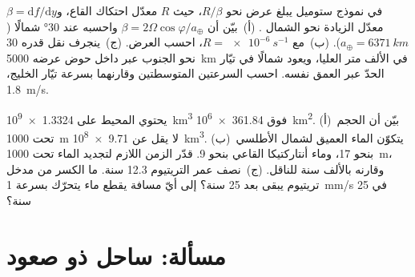 \begin{exercise}[$\star\star\star$]\label{exo:b1:ocean-circulation:11}
في نموذج ستوميل يبلغ عرض  نحو $R/\beta$، حيث $R$ معدّل احتكاك القاع، و$\beta = \mathrm df/\mathrm dy$ معدّل الزيادة نحو الشمال . (أ)~بيّن أن $\beta = 2\Omega
\cos\varphi/a_\oplus$ واحسبه عند \ang{30} شمالًا ($a_\oplus = \qty{6371}{km}$). (ب)~مع $R = \qty{e-6}{s^{-1}}$، احسب العرض. (ج)~ينجرف نقل قدره \qty{30}{\sverdrup} نحو الجنوب عبر داخل حوض عرضه \qty{5000}{km} في الألف متر العليا، ويعود شمالًا في تيّار الحدّ عبر العمق نفسه. احسب السرعتين المتوسطتين وقارنهما بسرعة تيّار الخليج، \qty{1.8}{m/s}.
\end{exercise}

\begin{exercise}[$\star\star\star$]\label{exo:b1:ocean-circulation:12}
يحتوي المحيط على \qty{1.3324e9}{km^3} فوق \qty{361.84e6}{km^2}. (أ)~بيّن أن الحجم تحت \qty{1000}{m} لا يقل عن \qty{9.71e8}{km^3}. (ب)~يتكوّن الماء العميق لشمال الأطلسي بنحو \qty{17}{\sverdrup}، وماء أنتاركتيكا القاعي بنحو \qty{9}{\sverdrup}. قدّر الزمن اللازم لتجديد الماء تحت \qty{1000}{m}، وقارنه بالألف سنة للناقل. (ج)~نصف عمر التريتيوم 12.3 سنة. ما الكسر من مدخل تريتيوم يبقى بعد 25 سنة؟ إلى أيّ مسافة يقطع ماء يتحرّك بسرعة \qty{1}{mm/s} في 25 سنة؟
\end{exercise}

\section{مسألة: ساحل ذو صعود}

